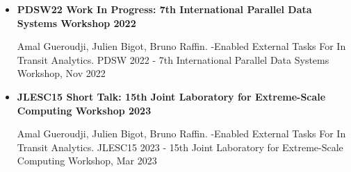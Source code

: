 \begin{itemize}
  \item \textbf{PDSW22 Work In Progress: 7th International Parallel Data Systems Workshop 2022}
  
Amal Gueroudji, Julien Bigot, Bruno Raffin. \dask-Enabled External Tasks For In Transit Analytics. PDSW 2022 - 7th International Parallel Data Systems Workshop, Nov 2022 

  \item \textbf{JLESC15 Short Talk: 15th Joint Laboratory for Extreme-Scale Computing Workshop 2023}
  
Amal Gueroudji, Julien Bigot, Bruno Raffin. \dask-Enabled External Tasks For In Transit Analytics. JLESC15 2023 - 15th Joint Laboratory for Extreme-Scale Computing Workshop, Mar 2023 

\end{itemize}


